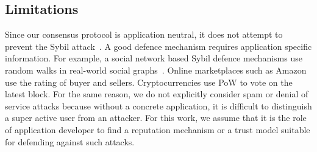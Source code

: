 \subsection*{Limitations}
Since our consensus protocol is application neutral, it does not attempt to prevent the Sybil attack~\cite{douceur2002sybil}.
A good defence mechanism requires application specific information.
For example, a social network based Sybil defence mechanisms use random walks in real-world social graphs~\cite{yu2006sybilguard}.
Online marketplaces such as Amazon use the rating of buyer and sellers.
Cryptocurrencies use PoW to vote on the latest block.
For the same reason, we do not explicitly consider spam or denial of service attacks 
because without a concrete application,
it is difficult to distinguish a super active user from an attacker.
For this work,
we assume that it is the role of application developer to find a reputation mechanism or a trust model suitable for defending against such attacks.




